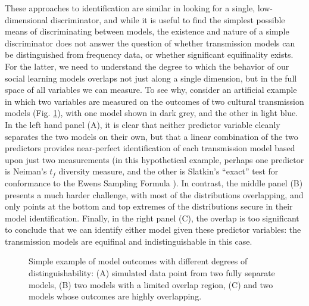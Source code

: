 \documentclass[10pt,letterpaper]{article}
\begin{document}
These approaches to identification are similar in looking for a single, low-dimensional discriminator, and while it is useful to find the simplest possible means of discriminating between models, the existence and nature of a simple discriminator does not answer the question of whether transmission models can be distinguished from frequency data, or whether significant equifinality exists.  For the latter, we need to understand the degree to which the behavior of our social learning models overlaps not just along a single dimension, but in the full space of all variables we can measure.  To see why, consider an artificial example in which two variables are measured on the outcomes of two cultural transmission models (Fig. \ref{fig2}), with one model shown in dark grey, and the other in light blue.  In the left hand panel (A), it is clear that neither predictor variable cleanly separates the two models on their own, but that a linear combination of the two predictors provides near-perfect identification of each transmission model based upon just two measurements (in this hypothetical example, perhaps one predictor is Neiman's $t_f$ diversity measure, and the other is Slatkin's ``exact'' test for conformance to the Ewens Sampling Formula \cite{Neiman:1995p23690,slatkin1994exact}).  In contrast, the middle panel (B) presents a much harder challenge, with most of the distributions overlapping, and only points at the bottom and top extremes of the distributions secure in their model identification.  Finally, in the right panel (C), the overlap is too significant to conclude that we can identify either model given these predictor variables:  the transmission models are equifinal and indistinguishable in this case. 

\begin{figure}[h]
\caption{Simple example of model outcomes with different degrees of distinguishability: (A) simulated data point from two fully separate models, (B) two models with a limited overlap region, (C) and two models whose outcomes are highly overlapping.}
\label{fig2}
\end{figure}
\end{document}
